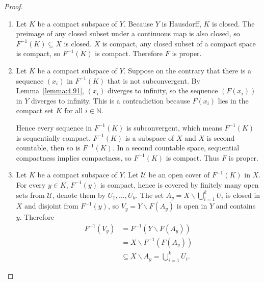 \begin{proof}
	\begin{enumerate}[label={(\alph*)}]
		\item Let $K$ be a compact subspace of $Y$. Because $Y$ is Hausdorff, $K$ is closed. The preimage of any closed subset under a continuous map is also closed, so $F^{-1}(K) \subseteq X$ is closed. $X$ is compact, any closed subset of a compact space is compact, so $F^{-1}(K)$ is compact. Therefore $F$ is proper.
		\item Let $K$ be a compact subspace of $Y$. Suppose on the contrary that there is a sequence ${(x_{i})}$ in $F^{-1}(K)$ that is not subconvergent. By Lemma~\ref{lemma:4.91}, ${(x_{i})}$ diverges to infinity, so the sequence ${(F(x_{i}))}$ in $Y$ diverges to infinity. This is a contradiction because $F(x_{i})$ lies in the compact set $K$ for all $i\in\mathbb{N}$.

		      Hence every sequence in $F^{-1}(K)$ is subconvergent, which means $F^{-1}(K)$ is sequentially compact. $F^{-1}(K)$ is a subspace of $X$ and $X$ is second countable, then so is $F^{-1}(K)$. In a second countable space, sequential compactness implies compactness, so $F^{-1}(K)$ is compact. Thus $F$ is proper.
		\item Let $K$ be a compact subspace of $Y$. Let $\mathscr{U}$ be an open cover of $F^{-1}(K)$ in $X$. For every $y\in K$, $F^{-1}(y)$ is compact, hence is covered by finitely many open sets from $\mathscr{U}$, denote them by $U_{1}, \ldots, U_{k}$. The set $A_{y} = X\smallsetminus \bigcup^{k}_{i=1}U_{i}$ is closed in $X$ and disjoint from $F^{-1}(y)$, so $V_{y} = Y\smallsetminus F(A_{y})$ is open in $Y$ and contains $y$. Therefore
		      \begin{align*}
			      F^{-1}(V_{y}) & = F^{-1}(Y\smallsetminus F(A_{y}))                         \\
			                    & = X \smallsetminus F^{-1}(F(A_{y}))                        \\
			                    & \subseteq X \smallsetminus A_{y} = \bigcup^{k}_{i=1}U_{i}.
		      \end{align*}


\end{enumerate}
\end{proof}
